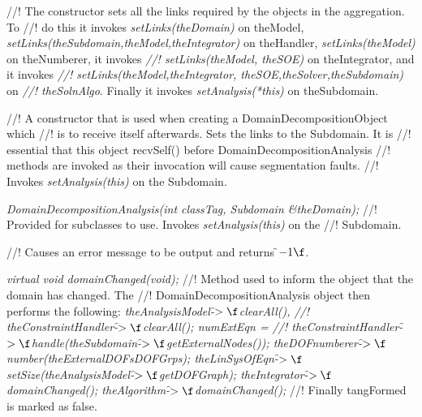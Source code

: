 //! The constructor sets all the links required by the objects in the aggregation. To
//! do this it invokes {\em setLinks(theDomain)} on \p theModel,
{\em setLinks(theSubdomain,theModel,theIntegrator)} on \p theHandler, 
{\em setLinks(theModel)} on \p theNumberer, it invokes {\em
//! setLinks(theModel, theSOE)} on \p theIntegrator, and it invokes {\em
//! setLinks(theModel,theIntegrator, theSOE,theSolver,theSubdomain)} on {\em
//! theSolnAlgo}. Finally it invokes {\em setAnalysis(*this)} on \p theSubdomain.

//! A constructor that is used when creating a DomainDecompositionObject which
//! is to receive itself afterwards. Sets the links to the Subdomain. It is
//! essential that this object recvSelf() before DomainDecompositionAnalysis
//! methods are invoked as their invocation will cause segmentation faults. 
//! Invokes {\em setAnalysis(this)} on the Subdomain.

{\em DomainDecompositionAnalysis(int classTag, Subdomain \&theDomain);}
//! Provided for subclasses to use. Invokes {\em setAnalysis(this)} on the
//! Subdomain. 



//! Causes an error message to be output and returns \f$-1\f$.

{\em virtual void domainChanged(void);}
//! Method used to inform the object that the domain has changed. The
//! DomainDecompositionAnalysis object then performs the following: {\em
\indent\indent theAnalysisModel-\f$>\f$clearAll(),
//! theConstraintHandler-\f$>\f$clearAll(); 
\indent\indent numExtEqn =
//! theConstraintHandler-\f$>\f$handle(theSubdomain-\f$>\f$getExternalNodes()); 
\indent\indent theDOFnumberer-\f$>\f$number(theExternalDOFsDOFGrps);
\indent\indent theLinSysOfEqn-\f$>\f$setSize(theAnalysisModel-\f$>\f$getDOFGraph);
\indent\indent theIntegrator-\f$>\f$domainChanged();
\indent\indent theAlgorithm-\f$>\f$domainChanged(); }
//! Finally \p tangFormed is marked as \p false.

